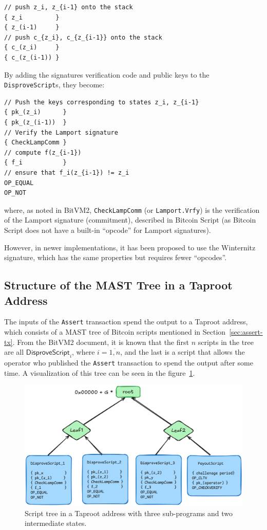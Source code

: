 \documentclass[11pt]{article}
\begin{document}
\begin{verbatim}
// push z_i, z_{i-1} onto the stack
{ z_i         }
{ z_(i-1)     }
// push c_{z_i}, c_{z_{i-1}} onto the stack
{ c_(z_i)     }
{ c_(z_(i-1)) }
\end{verbatim}

By adding the signatures verification code and public keys to the
\texttt{DisproveScript}s, they become:

\begin{verbatim}
// Push the keys corresponding to states z_i, z_{i-1}
{ pk_(z_i)      }
{ pk_(z_(i-1))  }
// Verify the Lamport signature
{ CheckLampComm }
// compute f(z_{i-1})
{ f_i           }
// ensure that f_i(z_{i-1}) != z_i
OP_EQUAL
OP_NOT
\end{verbatim}

where, as noted in BitVM2, \texttt{CheckLampComm} (or
\texttt{Lamport.Vrfy}) is the verification of the Lamport signature
(commitment), described in Bitcoin Script (as Bitcoin Script does not
have a built-in ``opcode'' for Lamport signatures).

However, in newer implementations, it has been proposed to use the
Winternitz signature, which has the same properties but requires fewer
``opcodes''.

\subsection{Structure of the MAST Tree in a Taproot
Address}\label{sec:mast-tree-structure}

The inputs of the \texttt{Assert} transaction spend the output to a
Taproot address, which consists of a MAST tree of Bitcoin scripts
mentioned in Section~\ref{sec:assert-tx}. From the BitVM2 document, it
is known that the first \(n\) scripts in the tree are all
\(\mathsf{DisproveScript}_i\), where \(i = \overline{1, n}\), and the last is a
script that allows the operator who published the \texttt{Assert}
transaction to spend the output after some time. A visualization of
this tree can be seen in the figure~\ref{fig:assert-tx-mast-tree}.

\begin{figure}[htbp]
  \centering
  \includegraphics[width=.9\linewidth]{../images/assert-tx-taproot-output.png}
  \caption{\label{fig:assert-tx-mast-tree}Script tree in a Taproot
  address with three sub-programs and two intermediate states.}
\end{figure}
\end{document}
